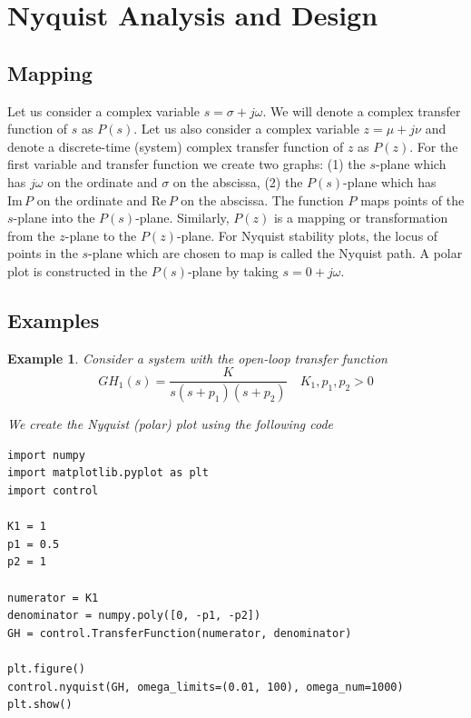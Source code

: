 \documentclass[11pt]{book}
\theoremstyle{example}
\newtheorem{example}{Example}[section]
\begin{document}
\section{Nyquist Analysis and Design}

\subsection{Mapping}

Let us consider a complex variable $s=\sigma+j\omega$. We will denote a complex transfer function of $s$ as $P(s)$. Let us also consider a complex variable $z=\mu+j\nu$ and denote a discrete-time (system) complex transfer function of $z$  as $P(z)$. For the first variable and transfer function we create two graphs: (1) the $s$-plane which has $j\omega$ on the ordinate and $\sigma$ on the abscissa, (2) the $P(s)$-plane which has $\mathrm{Im}\,P$ on the ordinate and $\mathrm{Re}\,P$ on the abscissa. The function $P$ maps points of the $s$-plane into the $P(s)$-plane. Similarly, $P(z)$ is a mapping or transformation from the $z$-plane to the $P(z)$-plane. For Nyquist stability plots, the locus of points in the $s$-plane which are chosen to map is called the Nyquist path. A polar plot is constructed in the $P(s)$-plane by taking $s=0+j\omega$.  

\subsection{Examples}

\begin{example}
	Consider a system with the open-loop transfer function
	\begin{equation}
		GH_1(s)=\frac{K}{s(s+p_1)(s+p_2)}\quad{K_1,p_1,p_2>0}
	\end{equation}

	We create the Nyquist (polar) plot using the following code
\begin{verbatim}
import numpy
import matplotlib.pyplot as plt
import control

K1 = 1
p1 = 0.5
p2 = 1

numerator = K1
denominator = numpy.poly([0, -p1, -p2])
GH = control.TransferFunction(numerator, denominator)

plt.figure()
control.nyquist(GH, omega_limits=(0.01, 100), omega_num=1000)
plt.show()
\end{verbatim}

\end{example}
\end{document}
